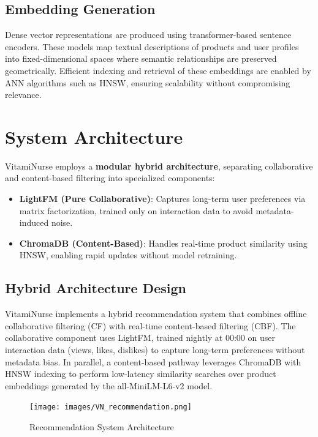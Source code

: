 \subsection{Embedding Generation}
Dense vector representations are produced using transformer-based sentence encoders. These models map textual descriptions of products and
user profiles into fixed-dimensional spaces where semantic relationships
are preserved geometrically. Efficient indexing and retrieval of these
embeddings are enabled by ANN algorithms such as HNSW, ensuring
scalability without compromising relevance.


\section{System Architecture}
VitamiNurse employs a \textbf{modular hybrid architecture}, separating collaborative and content-based filtering into specialized components:
\begin{itemize}
    \item \textbf{LightFM (Pure Collaborative)}: Captures long-term user preferences via matrix factorization, trained only on interaction data to avoid metadata-induced noise.
    \item \textbf{ChromaDB (Content-Based)}: Handles real-time product similarity using HNSW, enabling rapid updates without model retraining.
\end{itemize}

\subsection{Hybrid Architecture Design}

VitamiNurse implements a hybrid recommendation system that combines
offline collaborative filtering (CF) with real-time content-based filtering (CBF). The collaborative component uses LightFM, trained
nightly at 00:00 on user interaction data (views, likes, dislikes) to capture
long-term preferences without metadata bias. In parallel, a content-based pathway leverages ChromaDB with HNSW indexing to perform
low-latency similarity searches over product embeddings generated by
the all-MiniLM-L6-v2 model.

\begin{center}
\begin{figure}[H]
    \texttt{[image: images/VN\_recommendation.png]}
    \caption{Recommendation System Architecture } 
    \label{fig:Recommendation_Sequence_Diagram}
\end{figure}
\end{center}

